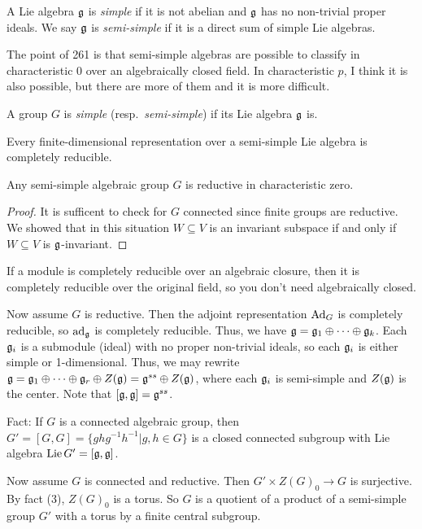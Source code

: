 
\begin{definition}
 A Lie algebra $\mathfrak{g}$ is \emph{simple} if it is not abelian and $\mathfrak{g}$ has no non-trivial proper ideals. We say $\mathfrak{g}$ is \emph{semi-simple} if it is a direct sum of simple Lie algebras.
\end{definition}
The point of 261 is that semi-simple algebras are possible to classify in characteristic 0 over an algebraically closed field. In characteristic $p$, I think it is also possible, but there are more of them and it is more difficult.
\begin{definition}
 A group $G$ is \emph{simple} (resp.~\emph{semi-simple}) if its Lie algebra $\mathfrak{g}$ is.
\end{definition}
\begin{theorem}
 Every finite-dimensional representation over a semi-simple Lie algebra is completely reducible.
\end{theorem}
\begin{theorem}
 Any semi-simple algebraic group $G$ is reductive in characteristic zero.
\end{theorem}
\begin{proof}
 It is sufficent to check for $G$ connected since finite groups are reductive. We showed that in this situation $W\subseteq V$ is an invariant subspace if and only if $W\subseteq V$ is $\mathfrak{g}$-invariant.
\end{proof}
\begin{remark}
 If a module is completely reducible over an algebraic closure, then it is completely reducible over the original field, so you don't need algebraically closed.
\end{remark}

Now assume $G$ is reductive. Then the adjoint representation $\mathrm{Ad}_G$ is completely reducible, so $\mathrm{ad}_{\mathfrak{g}}$ is completely reducible. Thus, we have $\mathfrak{g}=\mathfrak{g}_1\oplus\cdots\oplus \mathfrak{g}_k$. Each $\mathfrak{g}_i$ is a submodule (ideal) with no proper non-trivial ideals, so each $\mathfrak{g}_i$ is either simple or 1-dimensional. Thus, we may rewrite $\mathfrak{g}=\mathfrak{g}_1\oplus\cdots \oplus \mathfrak{g}_r \oplus Z(\mathfrak{g})=\mathfrak{g}^{ss}\oplus Z(\mathfrak{g})$, where each $\mathfrak{g}_i$ is semi-simple and $Z(\mathfrak{g})$ is the center. Note that $[\mathfrak{g},\mathfrak{g}]=\mathfrak{g}^{ss}$.

Fact:  If $G$ is a connected algebraic group, then $G'=[G,G]=\{ghg^{-1}h^{-1}|g,h\in G\}$ is a closed connected subgroup with Lie algebra $\operatorname{Lie} G'=[\mathfrak{g},\mathfrak{g}]$.

Now assume $G$ is connected and reductive. Then $G'\times Z(G)_0\to G$ is surjective. By fact (3), $Z(G)_0$ is a torus. So $G$ is a quotient of a product of a semi-simple group $G'$ with a torus by a finite central subgroup.

